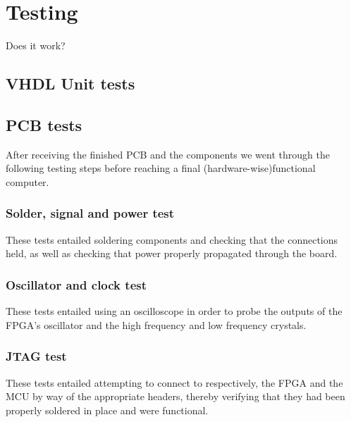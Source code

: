 \chapter{Testing}

Does it work?

\section{VHDL Unit tests}




\section{PCB tests}

After receiving the finished PCB and the components we went through the following testing steps before reaching a final (hardware-wise)functional computer.   

\subsection{Solder, signal and power test}
These tests entailed soldering components and checking that the connections held, as well as checking that power properly propagated through the board.  


\subsection{Oscillator and clock test}
These tests entailed using an oscilloscope in order to probe the outputs of the FPGA's oscillator and the high frequency and low frequency crystals.


\subsection{JTAG test}
These tests entailed attempting to connect to respectively, the FPGA and the MCU by way of the appropriate headers, thereby verifying that they had been properly soldered in place and were functional.

